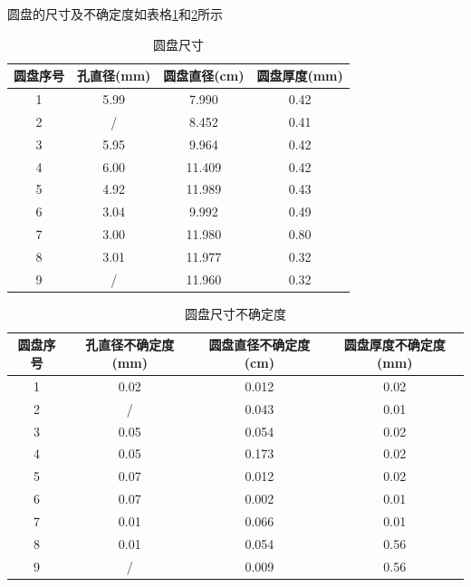 \documentclass[UTF8]{gapd}
\begin{document}
圆盘的尺寸及不确定度如表格\ref{tab:unsinkable_disc_disc's_size}和\ref{tab:unsinkable_disc_disc's_uncertainty}所示
\begin{table}[h]
    \centering
    \begin{tabular}{cccc}
        \toprule[1.5pt]
         圆盘序号&孔直径(mm)&圆盘直径(cm)&圆盘厚度(mm)\\
        \midrule[0.75pt]
         1&5.99&7.990&0.42\\
         2&/&8.452&0.41\\
         3&5.95&9.964&0.42\\
         4&6.00&11.409&0.42\\
         5&4.92&11.989&0.43\\
         6&3.04&9.992&0.49\\
         7&3.00&11.980&0.80\\
         8&3.01&11.977&0.32\\
         9&/&11.960&0.32\\
        \bottomrule[1.5pt]
    \end{tabular}
    \caption{圆盘尺寸}
    \label{tab:unsinkable_disc_disc's_size}
\end{table}
\begin{table}[h]
    \centering
    \begin{tabular}{cccc}
        \toprule[1.5pt]
         圆盘序号&孔直径不确定度(mm)&圆盘直径不确定度(cm)&圆盘厚度不确定度(mm)\\
        \midrule[0.75pt]
         1&0.02&0.012&0.02\\
         2&/&0.043&0.01\\
         3&0.05&0.054&0.02\\
         4&0.05&0.173&0.02\\
         5&0.07&0.012&0.02\\
         6&0.07&0.002&0.01\\
         7&0.01&0.066&0.01\\
         8&0.01&0.054&0.56\\
         9&/&0.009&0.56\\
         \bottomrule[1.5pt]
    \end{tabular}
    \caption{圆盘尺寸不确定度}
    \label{tab:unsinkable_disc_disc's_uncertainty}
\end{table}
\end{document}
